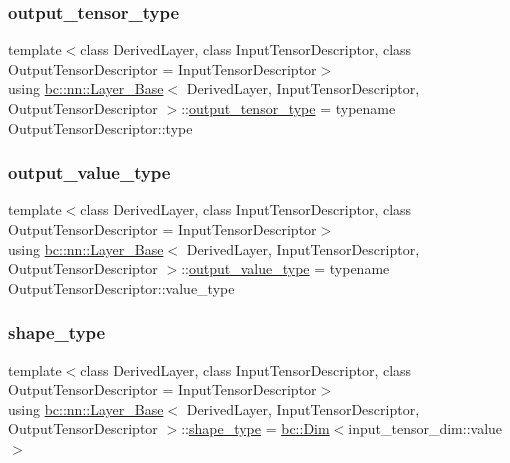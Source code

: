 \subsubsection{\texorpdfstring{output\+\_\+tensor\+\_\+type}{output\_tensor\_type}}
{\footnotesize\ttfamily template$<$class Derived\+Layer, class Input\+Tensor\+Descriptor, class Output\+Tensor\+Descriptor = Input\+Tensor\+Descriptor$>$ \\
using \hyperlink{structbc_1_1nn_1_1Layer__Base}{bc\+::nn\+::\+Layer\+\_\+\+Base}$<$ Derived\+Layer, Input\+Tensor\+Descriptor, Output\+Tensor\+Descriptor $>$\+::\hyperlink{structbc_1_1nn_1_1Layer__Output__Base_a57be15759728568401b4e551f8a8613b}{output\+\_\+tensor\+\_\+type} =  typename Output\+Tensor\+Descriptor\+::type}

\mbox{\label{structbc_1_1nn_1_1Layer__Base_a599bd6711b2c80475d912ab4c4638170}} 
\subsubsection{\texorpdfstring{output\+\_\+value\+\_\+type}{output\_value\_type}}
{\footnotesize\ttfamily template$<$class Derived\+Layer, class Input\+Tensor\+Descriptor, class Output\+Tensor\+Descriptor = Input\+Tensor\+Descriptor$>$ \\
using \hyperlink{structbc_1_1nn_1_1Layer__Base}{bc\+::nn\+::\+Layer\+\_\+\+Base}$<$ Derived\+Layer, Input\+Tensor\+Descriptor, Output\+Tensor\+Descriptor $>$\+::\hyperlink{structbc_1_1nn_1_1Layer__Output__Base_acbef11226ebb0a194a319630a4f3c871}{output\+\_\+value\+\_\+type} =  typename Output\+Tensor\+Descriptor\+::value\+\_\+type}

\mbox{\label{structbc_1_1nn_1_1Layer__Base_ab8cbdaad20a0270b2555a91676a79932}} 
\subsubsection{\texorpdfstring{shape\+\_\+type}{shape\_type}}
{\footnotesize\ttfamily template$<$class Derived\+Layer, class Input\+Tensor\+Descriptor, class Output\+Tensor\+Descriptor = Input\+Tensor\+Descriptor$>$ \\
using \hyperlink{structbc_1_1nn_1_1Layer__Base}{bc\+::nn\+::\+Layer\+\_\+\+Base}$<$ Derived\+Layer, Input\+Tensor\+Descriptor, Output\+Tensor\+Descriptor $>$\+::\hyperlink{structbc_1_1nn_1_1Layer__Base_ab8cbdaad20a0270b2555a91676a79932}{shape\+\_\+type} =  \hyperlink{structbc_1_1Dim}{bc\+::\+Dim}$<$input\+\_\+tensor\+\_\+dim\+::value$>$}

